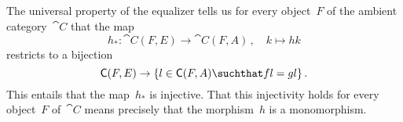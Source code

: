 \subsection{}

The universal property of the equalizer tells us for every object~$F$ of the ambient category~$\cat{C}$ that the map
\[
	h_*
	\colon
	\cat{C}(F, E) \to \cat{C}(F, A) \,,
	\quad
	k \mapsto h k
\]
restricts to a bijection
\[
	\cat{C}(F, E)
	\to
	\{ l \in \cat{C}(F, A) \suchthat f l = g l \} \,.
\]
This entails that the map~$h_*$ is injective.
That this injectivity holds for every object~$F$ of~$\cat{C}$ means precisely that the morphism~$h$ is a monomorphism.

